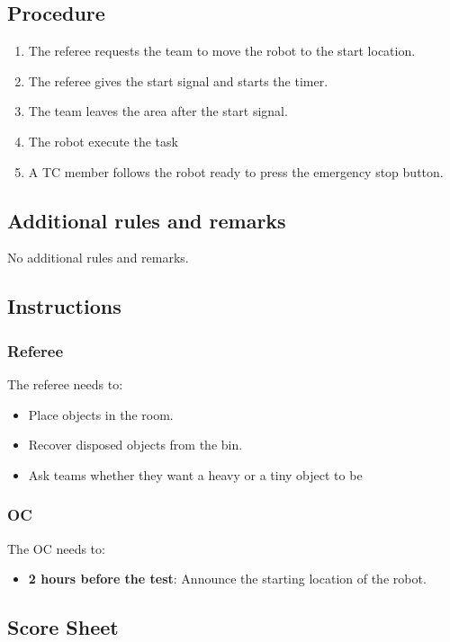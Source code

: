 \subsection*{Procedure}

\begin{enumerate}
	\item The referee requests the team to move the robot to the start location.
	\item The referee gives the start signal and starts the timer.
	\item The team leaves the area after the start signal.
	\item The robot execute the task
	\item A TC member follows the robot ready to press the emergency stop button.
\end{enumerate}

\subsection*{Additional rules and remarks}
	No additional rules and remarks.

\subsection*{Instructions}

\subsubsection*{Referee}

The referee needs to:
\begin{itemize}
	\item Place objects in the room.
	\item Recover disposed objects from the bin.
	\item Ask teams whether they want a heavy or a tiny object to be 
\end{itemize}

\subsubsection*{OC}
The OC needs to:
\begin{itemize}[nosep]
	\item \textbf{2 hours before the test}: Announce the starting location of the robot.
\end{itemize}

\subsection*{Score Sheet}

